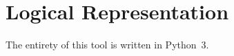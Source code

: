 
\section{Logical Representation}
\label{sec:logic-repr}

The entirety of this tool is written in Python~3.

